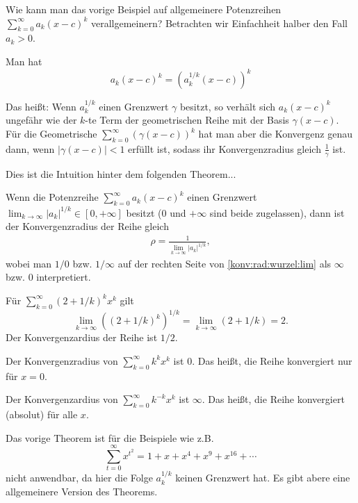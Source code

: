 \begin{bem} 
	Wie kann man das vorige Beispiel auf allgemeinere Potenzreihen $\sum_{k=0}^\infty a_k (x-c)^k$ verallgemeinern? Betrachten wir Einfachheit halber den Fall $a_k > 0$. 
	
	Man hat 
	\[
		 a_k (x-c)^k   = \left( a_k^{1/k} (x-c) \right)^k
	\] 
	
	Das heißt: Wenn $a_k^{1/k}$ einen Grenzwert $\gamma$ besitzt, so verhält sich $a_k (x-c)^k$ ungefähr wie der $k$-te Term der geometrischen Reihe mit der Basis $\gamma (x-c)$. Für die Geometrische $\sum_{k=0}^\infty (\gamma (x-c))^k$ hat man aber die Konvergenz genau dann, wenn $|\gamma (x-c)| < 1$ erfüllt ist, sodass ihr Konvergenzradius gleich $\frac{1}{\gamma}$ ist. 
	
	Dies ist die Intuition hinter dem folgenden Theorem...
\end{bem} 

\begin{thm}
	Wenn die Potenzreihe $\sum_{k=0}^\infty a_k (x-c)^k$ einen Grenzwert $\lim_{k \to \infty} |a_k|^{1/k} \in [0,+\infty]$ besitzt ($0$ und $+\infty$ sind beide zugelassen), dann ist der Konvergenzradius der Reihe gleich 
	\begin{align}
		\label{konv:rad:wurzel:lim}
		\rho = \frac{1}{ \lim_{k \to \infty} |a_k|^{1/k}},
	\end{align}
	wobei man $1/0$ bzw. $1/\infty$ auf der rechten Seite von \eqref{konv:rad:wurzel:lim} als $\infty$ bzw. $0$ interpretiert. 
\end{thm} 

\begin{bsp} 
	Für $\sum_{k=0}^\infty (2+ 1/k)^k x^k$ gilt 
	\[
		\lim_{k \to \infty} (( 2 + 1/k)^k)^{1/k} = \lim_{k \to \infty} (2 + 1/k)  = 2. 
	\]
	Der Konvergenzardius der Reihe ist $ 1/2$. 
\end{bsp} 

\begin{bsp} 
	Der Konvergenzradius von $\sum_{k=0}^\infty k^k x^k$ ist $0$. Das heißt, die Reihe konvergiert nur für $x=0$. 
\end{bsp} 

\begin{bsp} 
	Der Konvergenzardius von $\sum_{k=0}^\infty k^{-k} x^k$ ist $\infty$. Das heißt, die Reihe konvergiert (absolut) für alle $x$. 
\end{bsp} 

\begin{bem} 
	Das vorige Theorem ist für die Beispiele wie z.B.
	\[
		\sum_{t=0}^\infty x^{t^2} = 1 + x + x^4 + x^9 + x^{16} + \cdots 
	\]
	nicht anwendbar, da hier die Folge $a_k^{1/k}$ keinen Grenzwert hat. Es gibt abere eine allgemeinere Version des Theorems. 
\end{bem} 

